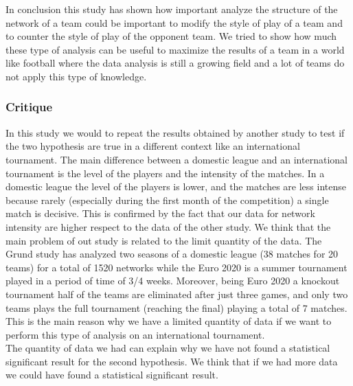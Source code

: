 \documentclass[12pt, a4paper]{article}
\begin{document}
In conclusion this study has shown how important analyze the structure of the network of a team could be important to modify the style of play of a team and to counter the style of play of the opponent team. We tried to show how much these type of analysis can be useful to maximize the results of a team in a world like football where the data analysis is still a growing field and a lot of teams do not apply this type of knowledge.\\

\subsubsection{Critique}
\label{critique}
In this study we would to repeat the results obtained by another study %
to test if the two hypothesis are true in a different context like an international tournament. The main difference between a domestic league and an international tournament is the level of the players and the intensity of the matches. In a domestic league the level of the players is lower, and the matches are less intense because rarely (especially during the first month of the competition) a single match is decisive. This is confirmed by the fact that our data for network intensity are higher respect to the data of the other study. 
We think that the main problem of out study is related to the limit quantity of the data. The Grund study has analyzed two seasons of a domestic league (38 matches for 20 teams) for a total of 1520 networks while the Euro 2020 is a summer tournament played in a period of time of 3/4 weeks. Moreover, being Euro 2020 a knockout tournament half of the teams are eliminated after just three games, and only two teams plays the full tournament (reaching the final) playing a total of 7 matches. This is the main reason why we have a limited quantity of data if we want to perform this type of analysis on an international tournament. \\
The quantity of data we had can explain why we have not found a statistical significant result for the second hypothesis. We think that if we had more data we could have found a statistical significant result. \\ 





\end{document}
